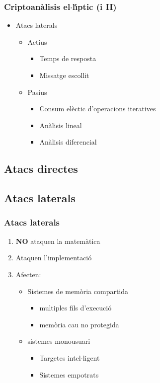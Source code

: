 \documentclass{beamer}
\theoremstyle{saltolinea}   			%
\begin{document}
\begin{frame}
  \frametitle{Criptoan\`alisis el$\cdot$l\'{\i}ptic (i II)}
  \begin{itemize}
    \item<1-> Atacs laterals
    \begin{itemize}
      \item<2-> Actius
      \begin{itemize}
        \item<3-> Temps de resposta
        \item<3-> Missatge escollit
      \end{itemize}
      \item<4-> Pasius
      \begin{itemize}
        \item<5-> Consum el\`ectic d'operacions iteratives
        \item<5-> An\`alisis lineal
        \item<5-> An\`alisis diferencial
      \end{itemize}
    \end{itemize}
  \end{itemize}
\end{frame}

\subsection{Atacs directes}

\subsection{Atacs laterals}

\begin{frame}
  \frametitle{Atacs laterals}
  \begin{enumerate}
    \item<2-> \textbf{NO} ataquen la matem\`atica
    \item<3-> Ataquen l'implementaci\'o
    \item<4-> Afecten:
    \begin{itemize}
      \item<5-> Sistemes de mem\`oria compartida
      \begin{itemize}
        \item<6-> multiples fils d'execuci\'o
        \item<6-> mem\`oria cau no protegida
      \end{itemize}
      \item<7-> sistemes monousuari
      \begin{itemize}
        \item<8-> Targetes intel$\cdot$ligent
        \item<8-> Sistemes empotrats
      \end{itemize}
    \end{itemize}
  \end{enumerate}
\end{frame}
\end{document}
